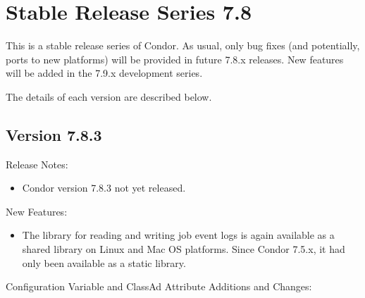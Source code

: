 
\section{\label{sec:History-7-8}Stable Release Series 7.8}

This is a stable release series of Condor.
As usual, only bug fixes (and potentially, ports to new platforms)
will be provided in future 7.8.x releases.
New features will be added in the 7.9.x development series.

The details of each version are described below.

\subsection*{\label{sec:New-7-8-3}Version 7.8.3}

\noindent Release Notes:

\begin{itemize}

\item Condor version 7.8.3 not yet released.

\end{itemize}


\noindent New Features:

\begin{itemize}

\item The  library for reading and writing job event
logs is again available as a shared library on Linux and Mac OS platforms.
Since Condor 7.5.x, it had only been available as a static library.

\end{itemize}

\noindent Configuration Variable and ClassAd Attribute Additions and Changes:

